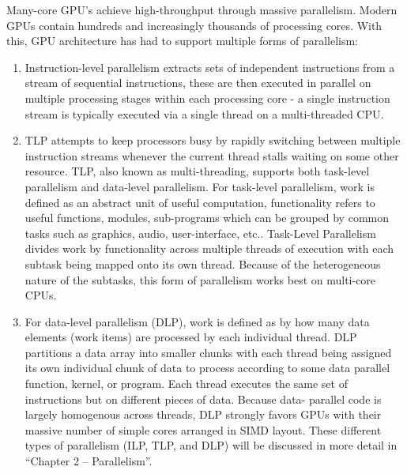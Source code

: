 \documentclass[10pt]{article}[draft]
\begin{document}
Many-core GPU’s achieve high-throughput through massive parallelism. Modern GPUs contain hundreds and increasingly thousands of processing cores. With this,  GPU architecture has had to support multiple forms of parallelism:
\begin{enumerate}
\item  Instruction-level parallelism extracts sets of independent instructions from a stream of sequential instructions, these are then executed in parallel on multiple processing stages within each processing core - a single instruction stream is typically executed via a single thread on a multi-threaded CPU. 
\item TLP attempts to keep processors busy by rapidly switching between multiple instruction streams whenever the current thread stalls waiting on some other resource. TLP, also known as multi-threading, supports both task-level parallelism and data-level parallelism. For task-level parallelism, work is defined as an abstract unit of useful computation, functionality refers to useful functions, modules, sub-programs which can be grouped by common tasks such as graphics, audio, user-interface, etc.. Task-Level Parallelism divides work by functionality across multiple threads of execution with each subtask being mapped onto its own thread. Because of the heterogeneous nature of the subtasks, this form of parallelism works best on multi-core CPUs. \item For data-level parallelism (DLP), work is defined as by how many data elements (work items) are processed by each individual thread. DLP partitions a data array into smaller chunks with each thread being assigned its own individual chunk of data to process according to some data parallel function, kernel, or program. Each thread executes the same set of instructions but on different pieces of data. Because data- parallel code is largely homogenous across threads, DLP strongly favors GPUs with their massive number of simple cores arranged in SIMD layout. These different types of parallelism (ILP, TLP, and DLP) will be discussed in more detail in “Chapter 2 – Parallelism”.
\end{enumerate}
\end{document}
